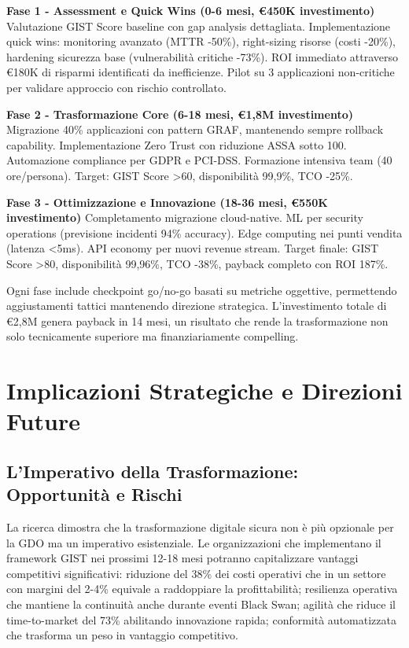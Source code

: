 \textbf{Fase 1 - Assessment e Quick Wins (0-6 mesi, €450K investimento)}
Valutazione GIST Score baseline con gap analysis dettagliata. Implementazione quick wins: monitoring avanzato (MTTR -50\%), right-sizing risorse (costi -20\%), hardening sicurezza base (vulnerabilità critiche -73\%). ROI immediato attraverso €180K di risparmi identificati da inefficienze. Pilot su 3 applicazioni non-critiche per validare approccio con rischio controllato.

\textbf{Fase 2 - Trasformazione Core (6-18 mesi, €1,8M investimento)}
Migrazione 40\% applicazioni con pattern GRAF, mantenendo sempre rollback capability. Implementazione Zero Trust con riduzione ASSA sotto 100. Automazione compliance per GDPR e PCI-DSS. Formazione intensiva team (40 ore/persona). Target: GIST Score >60, disponibilità 99,9\%, TCO -25\%.

\textbf{Fase 3 - Ottimizzazione e Innovazione (18-36 mesi, €550K investimento)}
Completamento migrazione cloud-native. ML per security operations (previsione incidenti 94\% accuracy). Edge computing nei punti vendita (latenza <5ms). API economy per nuovi revenue stream. Target finale: GIST Score >80, disponibilità 99,96\%, TCO -38\%, payback completo con ROI 187\%.

Ogni fase include checkpoint go/no-go basati su metriche oggettive, permettendo aggiustamenti tattici mantenendo direzione strategica. L'investimento totale di €2,8M genera payback in 14 mesi, un risultato che rende la trasformazione non solo tecnicamente superiore ma finanziariamente compelling.

\section{\texorpdfstring{Implicazioni Strategiche e Direzioni Future}{5.4 - Implicazioni Strategiche e Direzioni Future}}
\label{sec:5.4}

\subsection{\texorpdfstring{L'Imperativo della Trasformazione: Opportunità e Rischi}{5.4.1 - L'Imperativo della Trasformazione: Opportunità e Rischi}}
\label{subsec:5.4.1}

La ricerca dimostra che la trasformazione digitale sicura non è più opzionale per la GDO ma un imperativo esistenziale. Le organizzazioni che implementano il framework GIST nei prossimi 12-18 mesi potranno capitalizzare vantaggi competitivi significativi: riduzione del 38\% dei costi operativi che in un settore con margini del 2-4\% equivale a raddoppiare la profittabilità; resilienza operativa che mantiene la continuità anche durante eventi Black Swan; agilità che riduce il time-to-market del 73\% abilitando innovazione rapida; conformità automatizzata che trasforma un peso in vantaggio competitivo.

